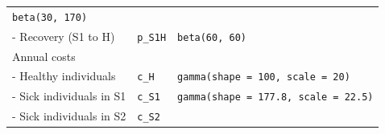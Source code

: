 \documentclass[]{book}
\begin{document}
\begin{longtable}[]{@{}lll@{}}
\begin{minipage}[t]{0.46\columnwidth}
\texttt{beta(30,\ 170)}\strut
\end{minipage}\tabularnewline
\begin{minipage}[t]{0.33\columnwidth}\raggedright
- Recovery (S1 to H)\strut
\end{minipage} & \begin{minipage}[t]{0.13\columnwidth}\raggedright
\texttt{p\_S1H}\strut
\end{minipage} & \begin{minipage}[t]{0.46\columnwidth}\raggedright
\texttt{beta(60,\ 60)}\strut
\end{minipage}\tabularnewline
\begin{minipage}[t]{0.33\columnwidth}\raggedright
Annual costs\strut
\end{minipage} & \begin{minipage}[t]{0.13\columnwidth}\raggedright
\strut
\end{minipage} & \begin{minipage}[t]{0.46\columnwidth}\raggedright
\strut
\end{minipage}\tabularnewline
\begin{minipage}[t]{0.33\columnwidth}\raggedright
- Healthy individuals\strut
\end{minipage} & \begin{minipage}[t]{0.13\columnwidth}\raggedright
\texttt{c\_H}\strut
\end{minipage} & \begin{minipage}[t]{0.46\columnwidth}\raggedright
\texttt{gamma(shape\ =\ 100,\ scale\ =\ 20)}\strut
\end{minipage}\tabularnewline
\begin{minipage}[t]{0.33\columnwidth}\raggedright
- Sick individuals in S1\strut
\end{minipage} & \begin{minipage}[t]{0.13\columnwidth}\raggedright
\texttt{c\_S1}\strut
\end{minipage} & \begin{minipage}[t]{0.46\columnwidth}\raggedright
\texttt{gamma(shape\ =\ 177.8,\ scale\ =\ 22.5)}\strut
\end{minipage}\tabularnewline
\begin{minipage}[t]{0.33\columnwidth}\raggedright
- Sick individuals in S2\strut
\end{minipage} & \begin{minipage}[t]{0.13\columnwidth}\raggedright
\texttt{c\_S2}\strut
\end{minipage} & \begin{minipage}[t]{0.46\columnwidth}\raggedright

\end{minipage}
\end{longtable}
\end{document}

